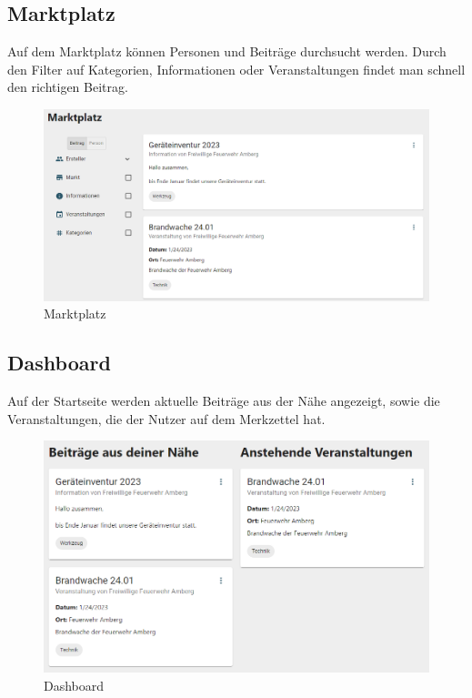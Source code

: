 \clearpage
\subsection{Marktplatz}
\label{sec:marketplace}

Auf dem Marktplatz können Personen und Beiträge durchsucht werden.
Durch den Filter auf Kategorien, Informationen oder Veranstaltungen findet man schnell den richtigen Beitrag.

\begin{figure}[ht!]
  \begin{centering}
    \includegraphics[width=1\textwidth]{figures/implementation/marktplatz.png}
    \caption{Marktplatz}
    \label{fig:marktplatz}
  \end{centering}
\end{figure}


\subsection{Dashboard}
\label{sec:dashboard}

Auf der Startseite werden aktuelle Beiträge aus der Nähe angezeigt, sowie die Veranstaltungen, die der Nutzer auf dem Merkzettel hat.

\begin{figure}[ht!]
  \begin{centering}
    \includegraphics[width=.8\textwidth]{figures/implementation/dashboard.png}
    \caption{Dashboard}
    \label{fig:dashboard}
  \end{centering}
\end{figure}

